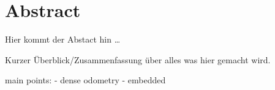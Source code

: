 \chapter*{Abstract}

Hier kommt der Abstact hin \dots

Kurzer Überblick/Zusammenfassung über alles was hier gemacht wird.

main points:
- dense odometry
- embedded
